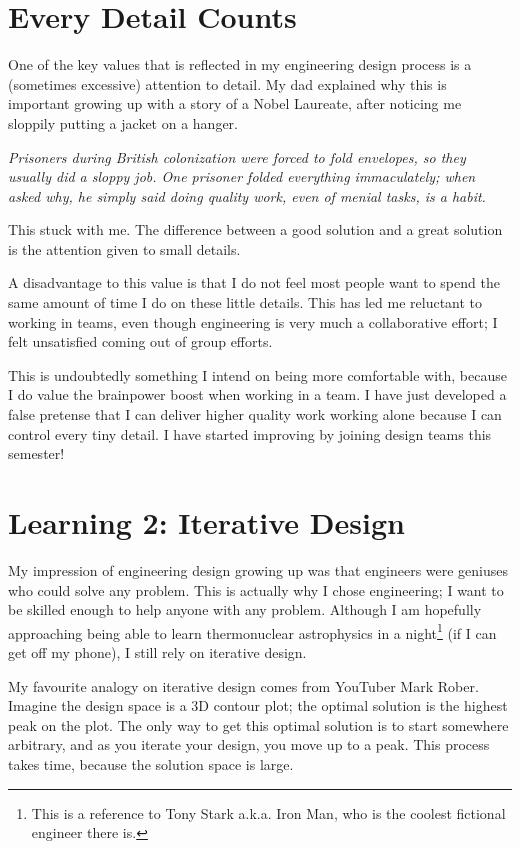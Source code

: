 \documentclass{antiquebook}
\begin{document}
		\section{Every Detail Counts}
		One of the key values that is reflected in my engineering design process is a (sometimes excessive) attention to detail. My dad explained why this is important growing up with a story of a Nobel Laureate, after noticing me sloppily putting a jacket on a hanger.
		\begin{displayquote}
			\it 
			Prisoners during British colonization were forced to fold envelopes, so they usually did a sloppy job. One prisoner folded everything immaculately; when asked why, he simply said doing quality work, even of menial tasks, is a habit. 
		\end{displayquote}
		This stuck with me. The difference between a good solution and a great solution is the attention given to small details. 
		
		A disadvantage to this value is that I do not feel most people want to spend the same amount of time I do on these little details. This has led me reluctant to working in teams, even though engineering is very much a collaborative effort; I felt unsatisfied coming out of group efforts. 

		This is undoubtedly something I intend on being more comfortable with, because I do value the brainpower boost when working in a team. I have just developed a false pretense that I can deliver higher quality work working alone because I can control every tiny detail. I have started improving by joining design teams this semester!
		\section{Learning 2: Iterative Design}
		My impression of engineering design growing up was that engineers were geniuses who could solve any problem. This is actually why I chose engineering; I want to be skilled enough to help anyone with any problem. Although I am hopefully approaching being able to learn thermonuclear astrophysics in a night\footnote{This is a reference to Tony Stark a.k.a. Iron Man, who is the coolest fictional engineer there is.} (if I can get off my phone), I still rely on iterative design.

		My favourite analogy on iterative design comes from YouTuber Mark Rober. Imagine the design space is a 3D contour plot; the optimal solution is the highest peak on the plot. The only way to get this optimal solution is to start somewhere arbitrary, and as you iterate your design, you move up to a peak. This process takes time, because the solution space is large. 
\end{document}
